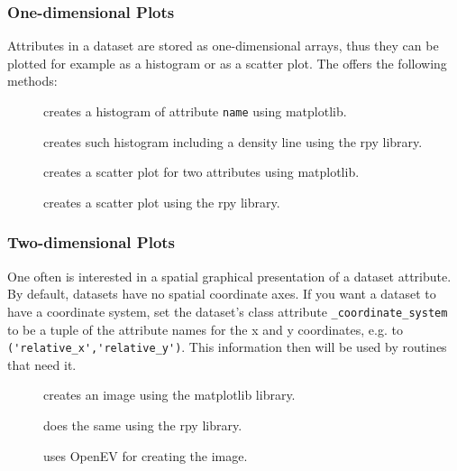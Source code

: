 \subsubsection{One-dimensional Plots}
%
Attributes \attributesindex in a dataset \datasetindex are stored as one-dimensional arrays, thus they can be
plotted for example as a histogram \histogramindex or as a scatter plot. \scatterplotindex The  
offers the following methods:

\begin{description}
\item[] \histogramindex creates a histogram \histogramindex of attribute \attributesindex
\verb|name| using matplotlib. \matplotlibindex
\item[] \rindex\histogramindex creates
such histogram \histogramindex including a density line using the rpy \rpyindex library.
\item[] \rindex\scatterplotindex creates a scatter plot \scatterplotindex for two
attributes \attributesindex using matplotlib. \matplotlibindex
\item[] \rindex\scatterplotindex creates a scatter plot \scatterplotindex 
using the rpy \rpyindex library.
\end{description}

\subsubsection{Two-dimensional Plots}
%
One often is interested in a spatial graphical presentation of a dataset
attribute.  By default, datasets have no spatial coordinate axes.  If you want
a dataset to have a coordinate system, set the dataset's class attribute
\verb|_coordinate_system| to be a tuple of the attribute names for the x and y
coordinates, e.g. to \verb|('relative_x','relative_y')|.  This information then
will be used by routines that need it.

\begin{description}
\item[] creates an image using the matplotlib \matplotlibindex
library.
\item[] \rindex does the same using the rpy \rpyindex
library.
\item[] \openevindex uses OpenEV \openevindex for creating the
  image.
\end{description}

